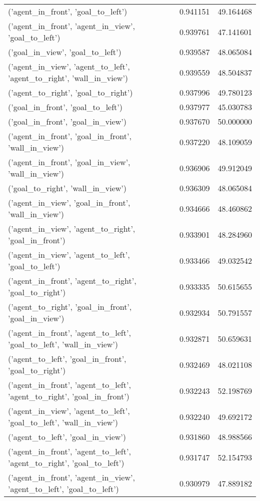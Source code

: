\begin{tabular}{lrr}
('agent\_in\_front', 'goal\_to\_left') & 0.941151 & 49.164468 \\
('agent\_in\_front', 'agent\_in\_view', 'goal\_to\_left') & 0.939761 & 47.141601 \\
('goal\_in\_view', 'goal\_to\_left') & 0.939587 & 48.065084 \\
('agent\_in\_view', 'agent\_to\_left', 'agent\_to\_right', 'wall\_in\_view') & 0.939559 & 48.504837 \\
('agent\_to\_right', 'goal\_to\_right') & 0.937996 & 49.780123 \\
('goal\_in\_front', 'goal\_to\_left') & 0.937977 & 45.030783 \\
('goal\_in\_front', 'goal\_in\_view') & 0.937670 & 50.000000 \\
('agent\_in\_front', 'goal\_in\_front', 'wall\_in\_view') & 0.937220 & 48.109059 \\
('agent\_in\_front', 'goal\_in\_view', 'wall\_in\_view') & 0.936906 & 49.912049 \\
('goal\_to\_right', 'wall\_in\_view') & 0.936309 & 48.065084 \\
('agent\_in\_view', 'goal\_in\_front', 'wall\_in\_view') & 0.934666 & 48.460862 \\
('agent\_in\_view', 'agent\_to\_right', 'goal\_in\_front') & 0.933901 & 48.284960 \\
('agent\_in\_view', 'agent\_to\_left', 'goal\_to\_left') & 0.933466 & 49.032542 \\
('agent\_in\_front', 'agent\_to\_right', 'goal\_to\_right') & 0.933335 & 50.615655 \\
('agent\_to\_right', 'goal\_in\_front', 'goal\_in\_view') & 0.932934 & 50.791557 \\
('agent\_in\_front', 'agent\_to\_left', 'goal\_to\_left', 'wall\_in\_view') & 0.932871 & 50.659631 \\
('agent\_to\_left', 'goal\_in\_front', 'goal\_to\_right') & 0.932469 & 48.021108 \\
('agent\_in\_front', 'agent\_to\_left', 'agent\_to\_right', 'goal\_in\_front') & 0.932243 & 52.198769 \\
('agent\_in\_view', 'agent\_to\_left', 'goal\_to\_left', 'wall\_in\_view') & 0.932240 & 49.692172 \\
('agent\_to\_left', 'goal\_in\_view') & 0.931860 & 48.988566 \\
('agent\_in\_front', 'agent\_to\_left', 'agent\_to\_right', 'goal\_to\_left') & 0.931747 & 52.154793 \\
('agent\_in\_front', 'agent\_in\_view', 'agent\_to\_left', 'goal\_to\_left') & 0.930979 & 47.889182 \\

\end{tabular}
